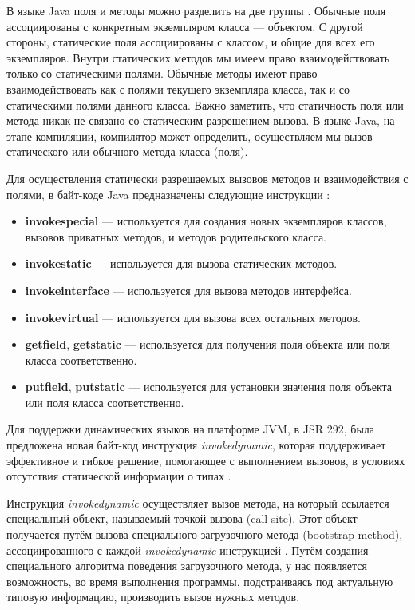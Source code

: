 В языке Java поля и методы можно разделить на две группы \cite{java:horstmann2012core}. Обычные поля ассоциированы с конкретным экземпляром класса --- объектом. С другой стороны, статические поля ассоциированы с классом, и общие для всех его экземпляров. Внутри статических методов мы имеем право взаимодействовать только со статическими полями. Обычные методы имеют право взаимодействовать как с полями текущего экземпляра класса, так и со статическими полями данного класса. Важно заметить, что статичность поля или метода никак не связано со статическим разрешением вызова. В языке Java, на этапе компиляции, компилятор может определить, осуществляем мы вызов статического или обычного метода класса (поля). %

Для осуществления статически разрешаемых вызовов методов и взаимодействия с полями, в байт-коде Java предназначены следующие инструкции \cite{book:yellin1996java}:

\begin{itemize}
    \item \textbf{invokespecial} --- используется для создания новых экземпляров классов, вызовов приватных методов, и методов родительского класса.
    \item \textbf{invokestatic} --- используется для вызова статических методов.
    \item \textbf{invokeinterface} --- используется для вызова методов интерфейса.
    \item \textbf{invokevirtual} --- используется для вызова всех остальных методов.
    \item \textbf{getfield}, \textbf{getstatic} --- используется для получения поля объекта или поля класса соответственно.
    \item \textbf{putfield}, \textbf{putstatic} --- используется для установки значения поля объекта или поля класса соответственно.
\end{itemize}


Для поддержки динамических языков на платформе JVM, в JSR 292, была предложена новая байт-код инструкция \textit{invokedynamic}, которая поддерживает эффективное и гибкое решение, помогающее с выполнением вызовов, в условиях отсутствия статической информации о типах \cite{java:JSR292rosejsr}.

Инструкция \textit{invokedynamic} осуществляет вызов метода, на который ссылается специальный объект, называемый точкой вызова (call site). Этот объект получается путём вызова специального загрузочного метода (bootstrap method), ассоциированного с каждой \textit{invokedynamic} инструкцией \cite{book:yellin1996java}. Путём создания специального алгоритма поведения загрузочного метода, у нас появляется возможность, во время выполнения программы, подстраиваясь под актуальную типовую информацию, производить вызов нужных методов.


